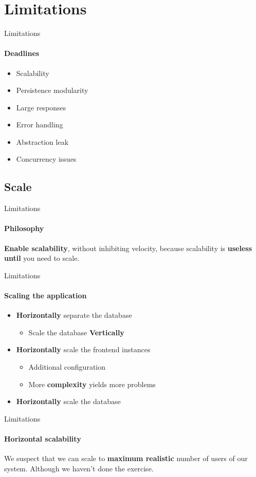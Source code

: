 \section{Limitations}

\begin{frame}{Limitations}
	\framesubtitle{Deadlines}
	\begin{itemize}
		\item{Scalability}
		\item{Persistence modularity}
		\item{Large responses}
		\item{Error handling}
		\item{Abstraction leak}
		\item{Concurrency issues}
	\end{itemize}
\end{frame}

\subsection{Scale}

\begin{frame}{Limitations}
	\framesubtitle{Philosophy}
	\textbf{Enable scalability}, without inhibiting velocity,
	because scalability is \textbf{useless until} you need to scale.
\end{frame}

\begin{frame}{Limitations}
	\framesubtitle{Scaling the application}
	\begin{itemize}
		\item\textbf{Horizontally} separate the database
			\begin{itemize}
				\item Scale the database \textbf{Vertically}
			\end{itemize}
		\item \textbf{Horizontally} scale the frontend instances
			\begin{itemize}
				\item Additional configuration
				\item More \textbf{complexity} yields more problems
			\end{itemize}
		\item \textbf{Horizontally} scale the database
	\end{itemize}
\end{frame}

\begin{frame}{Limitations}
	\framesubtitle{Horizontal scalability}
	We suspect that we can scale to \textbf{maximum realistic} number of users of our system. Although we haven't done the exercise.
\end{frame}

